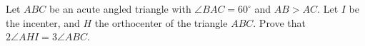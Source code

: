 Let $ABC$ be an acute angled triangle with $\angle{BAC}=60^\circ$ and $AB > AC$. Let $I$ be the incenter, and $H$ the orthocenter of the triangle $ABC$. Prove that $2\angle{AHI}= 3\angle{ABC}$.
